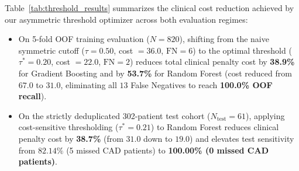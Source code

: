\documentclass[12pt,a4paper]{report}
\begin{document}
Table~\ref{tab:threshold_results} summarizes the clinical cost reduction achieved by our asymmetric threshold optimizer across both evaluation regimes:
\begin{itemize}
    \item On 5-fold OOF training evaluation ($N=820$), shifting from the naive symmetric cutoff ($\tau = 0.50$, cost $= 36.0$, $\text{FN} = 6$) to the optimal threshold ($\tau^* = 0.20$, cost $= 22.0$, $\text{FN} = 2$) reduces total clinical penalty cost by \textbf{38.9\%} for Gradient Boosting and by \textbf{53.7\%} for Random Forest (cost reduced from $67.0$ to $31.0$, eliminating all $13$ False Negatives to reach \textbf{100.0\% OOF recall}).
    \item On the strictly deduplicated 302-patient test cohort ($N_{\text{test}}=61$), applying cost-sensitive thresholding ($\tau^* = 0.21$) to Random Forest reduces clinical penalty cost by \textbf{38.7\%} (from $31.0$ down to $19.0$) and elevates test sensitivity from $82.14\%$ (5 missed CAD patients) to \textbf{100.00\% (0 missed CAD patients)}.
\end{itemize}

\begin{table}[htbp]
\centering
\caption{Impact of Asymmetric Cost-Sensitive Threshold Optimization ($C_{\text{FN}} = 5.0, C_{\text{FP}} = 1.0$).}
\label{tab:threshold_results}
\footnotesize
\renewcommand{\arraystretch}{1.3}
\end{table}
\end{document}
